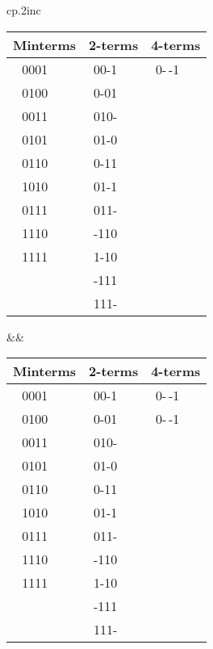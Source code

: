 \begin{tabular}{cp{.2in}c}
\begin{tabular}{cp{.1in}cp{.1in}cp{.1in}}
\multicolumn{2}{c}{Minterms} & \multicolumn{2}{c}{2-terms}  & \multicolumn{2}{c}{4-terms} \\\hline
0001 & \checkmark & \textcolor[rgb]{1.00,0.00,0.00}{00-1} & \checkmark & \textcolor[rgb]{1.00,0.00,0.00}{0-$\,$-1} &  \\
0100 & \checkmark & 0-01 &            &  &  \\\cline{1-2}
0011 & \checkmark & 010- &            &  &  \\
0101 & \checkmark & 01-0 &            &  &  \\\cline{3-4}
0110 & \checkmark & 0-11 &            &  &  \\
1010 & \checkmark & \textcolor[rgb]{1.00,0.00,0.00}{01-1} & \checkmark &  &  \\\cline{1-2}
0111 & \checkmark & 011- &            &  &  \\
1110 & \checkmark & -110 &            &  &  \\\cline{1-2}
1111 & \checkmark & 1-10 &            &  &  \\\cline{3-4}
     &            & -111 &            &  &  \\
     &            & 111- &            &  &  \\
\end{tabular}
&&
\begin{tabular}{cp{.1in}cp{.1in}cp{.1in}}
\multicolumn{2}{c}{Minterms} & \multicolumn{2}{c}{2-terms}  & \multicolumn{2}{c}{4-terms} \\\hline
0001 & \checkmark & 00-1 & \checkmark & 0-$\,$-1 &  \\
0100 & \checkmark & \textcolor[rgb]{1.00,0.00,0.00}{0-01} & \checkmark & \textcolor[rgb]{1.00,0.00,0.00}{0-$\,$-1} &  \\\cline{1-2}
0011 & \checkmark & 010- &            &  &  \\
0101 & \checkmark & 01-0 &            &  &  \\\cline{3-4}
0110 & \checkmark & \textcolor[rgb]{1.00,0.00,0.00}{0-11} & \checkmark &  &  \\
1010 & \checkmark & 01-1 & \checkmark &  &  \\\cline{1-2}
0111 & \checkmark & 011- &            &  &  \\
1110 & \checkmark & -110 &            &  &  \\\cline{1-2}
1111 & \checkmark & 1-10 &            &  &  \\\cline{3-4}
     &            & -111 &            &  &  \\
     &            & 111- &            &  &  \\
\end{tabular}\\
\end{tabular}

